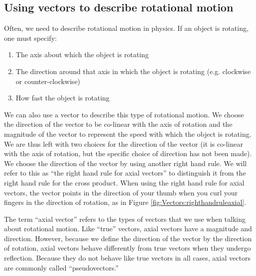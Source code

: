\subsection{Using vectors to describe rotational motion}
Often, we need to describe rotational motion in physics. If an object is rotating, one must specify:
\begin{enumerate}
\item The axis about which the object is rotating
\item The direction around that axis in which the object is rotating (e.g. clockwise or counter-clockwise)
\item How fast the object is rotating
\end{enumerate}
We can also use a vector to describe this type of rotational motion. We choose the direction of the vector to be co-linear with the axis of rotation and the magnitude of the vector to represent the speed with which the object is rotating. We are thus left with two choices for the direction of the vector (it is co-linear with the axis of rotation, but the specific choice of direction has not been made). We choose the direction of the vector by using another right hand rule. We will refer to this as ``the right hand rule for axial vectors'' to distinguish it from the right hand rule for the cross product. When using the right hand rule for axial vectors, the vector points in the direction of your thumb when you curl your fingers in the direction of rotation, as in Figure \ref{fig:Vectors:righthandruleaxial}.


The term ``axial vector'' refers to the types of vectors that we use when talking about rotational motion. Like ``true'' vectors, axial vectors have a magnitude and direction. However, because we define the direction of the vector by the direction of rotation, axial vectors behave differently from true vectors when they undergo reflection. Because they do not behave like true vectors in all cases, axial vectors are commonly called ``pseudovectors.'' 

